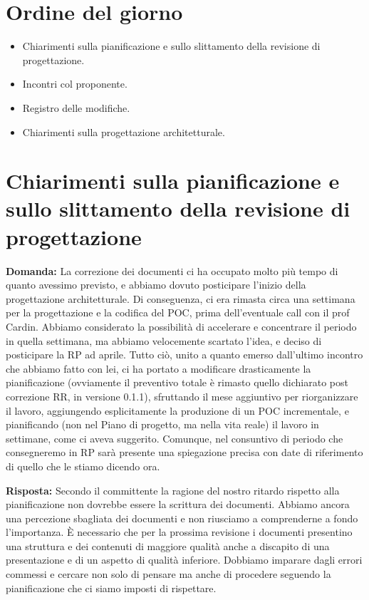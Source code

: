 \documentclass{article}
\begin{document}
\section{Ordine del giorno}%
\label{sec:ordine_del_giorno}

\begin{itemize}
  \item Chiarimenti sulla pianificazione e sullo slittamento della revisione di progettazione.
  \item Incontri col proponente.
  \item Registro delle modifiche.
  \item Chiarimenti sulla progettazione architetturale.
\end{itemize}

\section{Chiarimenti sulla pianificazione e sullo slittamento della revisione di progettazione}%
\label{sec:chiarimenti_sulla_pianificazione_e_sullo_slittamento_della_revisione_di_progettazione}

\textbf{Domanda:} La correzione dei documenti ci ha occupato molto più tempo di quanto avessimo previsto, e abbiamo dovuto posticipare l'inizio della progettazione architetturale.
Di conseguenza, ci era rimasta circa una settimana per la progettazione e la codifica del POC, prima dell'eventuale call con il prof Cardin. Abbiamo considerato la possibilità di accelerare e concentrare il periodo in quella settimana, ma abbiamo velocemente scartato l'idea, e deciso di posticipare la RP ad aprile.
Tutto ciò, unito a quanto emerso dall'ultimo incontro che abbiamo fatto con lei, ci ha portato a modificare drasticamente la pianificazione (ovviamente il preventivo totale è rimasto quello dichiarato post correzione RR, in versione 0.1.1), sfruttando il mese aggiuntivo per riorganizzare il lavoro, aggiungendo esplicitamente la produzione di un POC incrementale, e pianificando (non nel Piano di progetto, ma nella vita reale) il lavoro in settimane, come ci aveva suggerito.
Comunque, nel consuntivo di periodo che consegneremo in RP sarà presente una spiegazione precisa con date di riferimento di quello che le stiamo dicendo ora.

\textbf{Risposta:} Secondo il committente la ragione del nostro ritardo rispetto alla pianificazione non dovrebbe essere la scrittura dei documenti.
Abbiamo ancora una percezione sbagliata dei documenti e non riusciamo a comprenderne a fondo l'importanza.
È necessario che per la prossima revisione i documenti presentino una struttura e dei contenuti di maggiore qualità anche a discapito di una presentazione e di un aspetto di qualità inferiore.
Dobbiamo imparare dagli errori commessi e cercare non solo di pensare ma anche di procedere seguendo la pianificazione che ci siamo imposti di rispettare.\\
\end{document}
